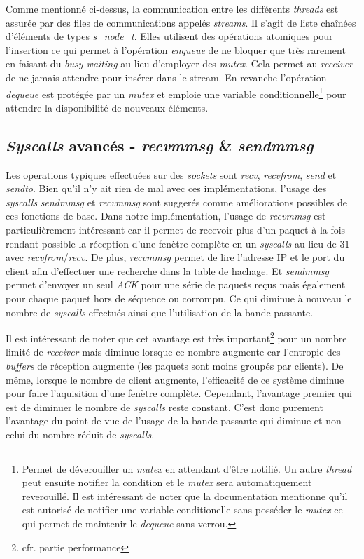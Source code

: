 \documentclass[../main.tex]{subfiles}
\begin{document}
Comme mentionné ci-dessus, la communication entre les différents \textit{threads} est assurée par des files de communications appelés \textit{streams}.
Il s'agit de liste chaînées d'éléments de types \textit{s\_node\_t}. Elles utilisent des opérations atomiques pour l'insertion ce qui permet
à l'opération \textit{enqueue} de ne bloquer que très rarement en faisant du \textit{busy waiting} au lieu d'employer des \textit{mutex}. Cela permet
au \textit{receiver} de ne jamais attendre pour insérer dans le stream. En revanche l'opération \textit{dequeue} est protégée par un \textit{mutex} et
emploie une variable conditionnelle\footnote{ Permet de déverouiller un \textit{mutex} en attendant d'être notifié. Un autre \textit{thread} peut ensuite notifier
la condition et le \textit{mutex} sera automatiquement reverouillé. Il est intéressant de noter que la documentation mentionne qu'il est autorisé
de notifier une variable conditionelle sans posséder le \textit{mutex} ce qui permet de maintenir le \textit{dequeue} sans verrou. } pour attendre la disponibilité de nouveaux éléments.

\subsection{\textit{Syscalls} avancés - \textit{recvmmsg} \& \textit{sendmmsg}}
\label{sec:syscalls}

Les operations typiques effectuées sur des \textit{sockets} sont \textit{recv}, \textit{recvfrom}, \textit{send} et \textit{sendto}. Bien qu'il n'y ait rien
de mal avec ces implémentations, l'usage des \textit{syscalls} \textit{sendmmsg} et \textit{recvmmsg} sont suggerés comme améliorations possibles\cite{that_awesome_paper}
de ces fonctions de base. Dans notre implémentation, l'usage de \textit{recvmmsg} est particulièrement intéressant car il permet de recevoir plus d'un paquet à la fois
rendant possible la réception d'une fenètre complète en un \textit{syscalls} au lieu de $31$ avec \textit{recvfrom}/\textit{recv}. De plus, \textit{recvmmsg} permet
de lire l'adresse IP et le port du client afin d'effectuer une recherche dans la table de hachage. Et \textit{sendmmsg} permet d'envoyer un seul \textit{ACK} pour
une série de paquets reçus mais également pour chaque paquet hors de séquence ou corrompu. Ce qui diminue à nouveau le nombre de \textit{syscalls} effectués ainsi que 
l'utilisation de la bande passante.

Il est intéressant de noter que cet avantage est très important\footnote{ cfr. partie performance} pour un nombre limité de \textit{receiver} mais diminue lorsque  
ce nombre augmente car l'entropie des \textit{buffers} de réception augmente (les paquets sont moins groupés par clients). De même, lorsque le nombre de client augmente, 
l'efficacité de ce système diminue pour faire l'aquisition d'une fenètre complète. Cependant, l'avantage premier qui est de diminuer le nombre de \textit{syscalls} 
reste constant. C'est donc purement l'avantage du point de vue de l'usage de la bande passante qui diminue et non celui du nombre réduit de \textit{syscalls}. 
\end{document}
